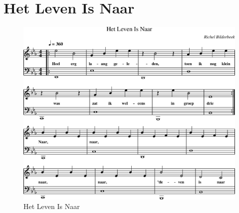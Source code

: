\chapter{Het Leven Is Naar}



\begin{figure}[!htbp]
  \includegraphics[width=\textwidth,height=\textheight,keepaspectratio]{../songs/18_het_leven_is_naar.png}
  \caption{Het Leven Is Naar}
  \label{fig:18_het_leven_is_naar}
\end{figure}
